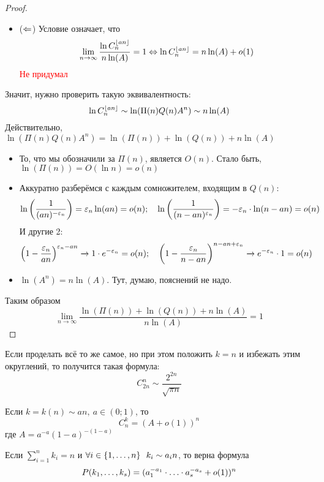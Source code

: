 \begin{proof}
\begin{itemize}
		\item ($\Leftarrow$) Условие означает, что
		\[
			\lim_{n \to \infty} \frac{\ln C_n^{\left\lfloor an \right\rfloor}}{n\ln(A)} = 1 \Leftrightarrow \ln C_n^{\left\lfloor an \right\rfloor} = n\ln(A) + o(1)
		\]
		\textcolor{red}{Не придумал}
	\end{itemize}
	Значит, нужно проверить такую эквивалентность:
	\[
		\ln C_n^{\left\lfloor an \right\rfloor} \sim \ln(\Pi(n)Q(n)A^n) \sim n\ln(A)	
	\]
	Действительно, $\ln(\Pi(n)Q(n)A^n) = \ln(\Pi(n)) + \ln(Q(n)) + n\ln(A)$
	\begin{itemize}
		\item То, что мы обозначили за $\Pi(n)$, является $O(n)$. Стало быть, $\ln(\Pi(n)) = O(\ln n) = o(n)$
		
		\item Аккуратно разберёмся с каждым сомножителем, входящим в $Q(n)$:
		\[
			\ln\left(\frac{1}{(an)^{-\varepsilon_n}}\right) = \varepsilon_n \ln(an) = o(n); \quad \ln\left(\frac{1}{(n - an)^{\varepsilon_n}}\right) = -\varepsilon_n \cdot \ln(n - an) = o(n)
		\]
		И другие 2:
		\[
			\left(1 - \frac{\varepsilon_n}{an}\right)^{\varepsilon_n - an} \xrightarrow{} 1 \cdot e^{-\varepsilon_n} = o(n); \quad \left(1 - \frac{\varepsilon_n}{n - an}\right)^{n - an + \varepsilon_n} \xrightarrow{} e^{-\varepsilon_n} \cdot 1 = o(n)
		\]
		
		\item $\ln(A^n) = n\ln(A)$. Тут, думаю, пояснений не надо.
	\end{itemize}
	Таким образом
	\[
		\lim_{n \to \infty} \frac{\ln(\Pi(n)) + \ln(Q(n)) + n\ln(A)}{n\ln(A)} = 1
	\]
\end{proof}

\begin{corollary}
	Если проделать всё то же самое, но при этом положить $k = n$ и избежать этим округлений, то получится такая формула:
	\[
		C_{2n}^n \sim \frac{2^{2n}}{\sqrt{\pi n}}
	\]
\end{corollary}

\begin{exercise}
	Если $k = k(n) \sim an,\ a \in (0; 1)$, то
	\[
		C_n^k = (A + o(1))^n
	\]
	где $A = a^{-a}(1 - a)^{-(1 - a)}$
\end{exercise}

\begin{exercise}
	Если $\sum_{i = 1}^n k_i = n$ и $\forall i \in \{1, \ldots, n\}\ \ k_i \sim a_in$, то верна формула
	\[
		P(k_1, \ldots, k_s) = (a_1^{-a_1} \cdot \ldots \cdot a_s^{-a_s} + o(1))^n
	\]
\end{exercise}